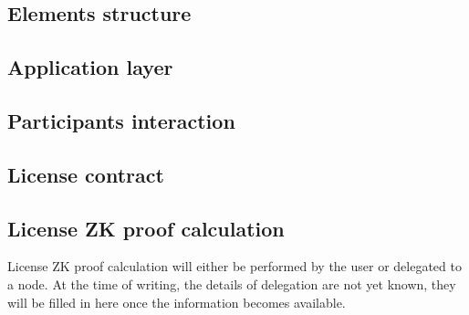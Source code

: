 

\subsection{Elements structure}
\label{sec:implementation:elements}



\subsection{Application layer}
\label{sec:implementation:application-layer}


\subsection{Participants interaction}
\label{sec:implementation:participants-interaction}


\subsection{License contract}
\label{sec:implementation:license-contract}


\subsection{License ZK proof calculation}

License ZK proof calculation will either be performed by the user or delegated to a node. At the time of writing, the details of delegation are not yet known, they will be filled in here once the information becomes available.